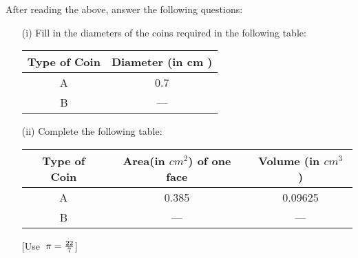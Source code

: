 \documentclass[15pt]{article}
\begin{document}
\begin{enumerate}
    After reading the above, answer the following questions:
     \begin{enumerate}
     \item [(i)] Fill in the diameters of the coins required in the following table:
     
   
     
   
         \def\arraystretch{1.5}
     \begin{tabular}{|c|c|}
          \hline
         Type of Coin  & Diameter (in cm ) \\ \hline
              A        &       0.7         \\ \hline
              B        &       ---         \\  \hline
     \end{tabular}
     
     \item [(ii)] Complete the following table:
       
   
       \vspace{0.2cm}
       \def\arraystretch{2.5}
         \begin{tabular}{|c|c|c|}
         \hline
           Type of Coin  & Area(in $cm^2$) of one face & Volume (in $cm^3$ ) \\ \hline
                                               
                A        &    0.385         &      0.09625        \\ \hline
                B        &     ---          &       ---         \\ \hline
         \end{tabular}
                               
                               
                               
        \hspace{7cm}        [Use$\hspace{0.2cm} \pi=\frac{22}{7}$]
       
    \end{enumerate}
    \end{enumerate}
\end{document}
